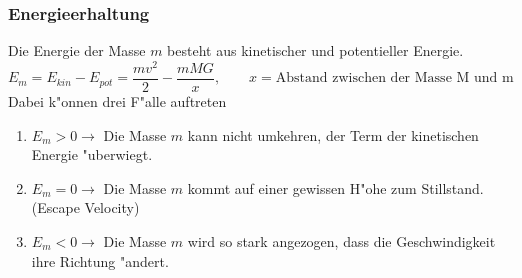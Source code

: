 \begin{refsection}
\subsubsection{Energieerhaltung}
Die Energie der Masse $m$ besteht aus kinetischer und potentieller Energie.
\begin{equation}
E_m = E_{kin} - E_{pot} =  \frac{m v^2}{2} - \frac{m M G }{x}, \qquad x = \text{Abstand zwischen der Masse M und m}
\end{equation}
Dabei k"onnen drei F"alle auftreten
\begin{enumerate}
	\item $E_m > 0 \rightarrow$ Die Masse $m$ kann nicht umkehren, der Term der kinetischen Energie "uberwiegt.
	\item $E_m = 0 \rightarrow$ Die Masse $m$ kommt auf einer gewissen H"ohe zum Stillstand. (Escape Velocity)
	\item $E_m < 0 \rightarrow$ Die Masse $m$ wird so stark angezogen, dass die Geschwindigkeit ihre Richtung "andert.
\end{enumerate}

\end{refsection}

